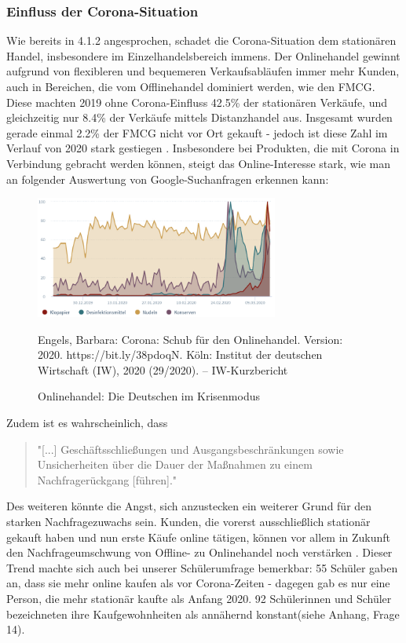 \begin{folding} \subsubsection{Einfluss der Corona-Situation}
 
 Wie bereits in 4.1.2 angesprochen, schadet die Corona-Situation dem stationären Handel, insbesondere im Einzelhandelsbereich immens. Der Onlinehandel gewinnt aufgrund von flexibleren und bequemeren Verkaufsabläufen immer mehr Kunden, auch in Bereichen, die vom Offlinehandel dominiert werden, wie den \ac{FMCG}. 
Diese machten 2019 ohne Corona-Einfluss 42.5\% der stationären Verkäufe, und gleichzeitig nur 8.4\% der Verkäufe mittels Distanzhandel aus. Insgesamt wurden gerade einmal 2.2\% der \ac{FMCG} nicht vor Ort gekauft - jedoch ist diese Zahl im Verlauf von 2020 stark gestiegen \cite{corona-schub}. Insbesondere bei Produkten, die mit Corona in Verbindung gebracht werden können, steigt das Online-Interesse stark, wie man an folgender Auswertung von Google-Suchanfragen erkennen kann: 

 \begin{figure}[h]
    \begin{center}
        \includegraphics[width=8cm]{media/Fabian-Corona-Produkte.png}
        \caption{Onlinehandel: Die Deutschen im Krisenmodus}
        \label{corona-produkte}
        \bildquelle  Engels, Barbara:   Corona: Schub für den Onlinehandel. Version: 2020. https://bit.ly/38pdoqN. Köln: Institut der deutschen Wirtschaft (IW), 2020 (29/2020). – IW-Kurzbericht
    \end{center}
\end{figure}
\noindent Zudem ist es wahrscheinlich, dass

\begin{quote}
    "[...] Geschäftsschließungen und Ausgangsbeschränkungen   sowie Unsicherheiten über die Dauer der Maßnahmen zu einem  Nachfragerückgang [führen]." \cite{corona-wettbewerb}
\end{quote}
Des weiteren könnte die Angst, sich anzustecken ein weiterer Grund für den starken Nachfragezuwachs sein. Kunden, die vorerst ausschließlich stationär gekauft haben und nun erste Käufe online tätigen, können vor allem in Zukunft den Nachfrageumschwung von Offline- zu Onlinehandel noch verstärken \cite{corona-schub}. Dieser Trend machte sich auch bei unserer Schülerumfrage bemerkbar: 55 Schüler gaben an, dass sie mehr online kaufen als vor Corona-Zeiten - dagegen gab es nur eine Person, die mehr stationär kaufte als Anfang 2020. 92 Schülerinnen und Schüler bezeichneten ihre Kaufgewohnheiten als annähernd konstant(siehe Anhang, Frage 14).


\end{folding}
